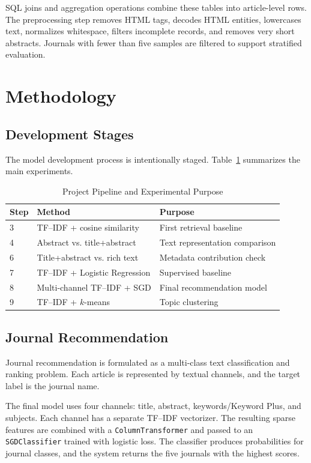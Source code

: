 \documentclass[conference]{IEEEtran}
\begin{document}
SQL joins and aggregation operations combine these tables into article-level rows. The preprocessing step removes HTML tags, decodes HTML entities, lowercases text, normalizes whitespace, filters incomplete records, and removes very short abstracts. Journals with fewer than five samples are filtered to support stratified evaluation.

\section{Methodology}

\subsection{Development Stages}
The model development process is intentionally staged. Table~\ref{tab:pipeline} summarizes the main experiments.

\begin{table}[htbp]
\centering
\caption{Project Pipeline and Experimental Purpose}
\label{tab:pipeline}
\begin{tabular}{lll}
\toprule
Step & Method & Purpose \\
\midrule
3 & TF--IDF + cosine similarity & First retrieval baseline \\
4 & Abstract vs. title+abstract & Text representation comparison \\
6 & Title+abstract vs. rich text & Metadata contribution check \\
7 & TF--IDF + Logistic Regression & Supervised baseline \\
8 & Multi-channel TF--IDF + SGD & Final recommendation model \\
9 & TF--IDF + $k$-means & Topic clustering \\
\bottomrule
\end{tabular}
\end{table}

\subsection{Journal Recommendation}
Journal recommendation is formulated as a multi-class text classification and ranking problem. Each article is represented by textual channels, and the target label is the journal name.

The final model uses four channels: title, abstract, keywords/Keyword Plus, and subjects. Each channel has a separate TF--IDF vectorizer. The resulting sparse features are combined with a \texttt{ColumnTransformer} and passed to an \texttt{SGDClassifier} trained with logistic loss. The classifier produces probabilities for journal classes, and the system returns the five journals with the highest scores.
\end{document}
